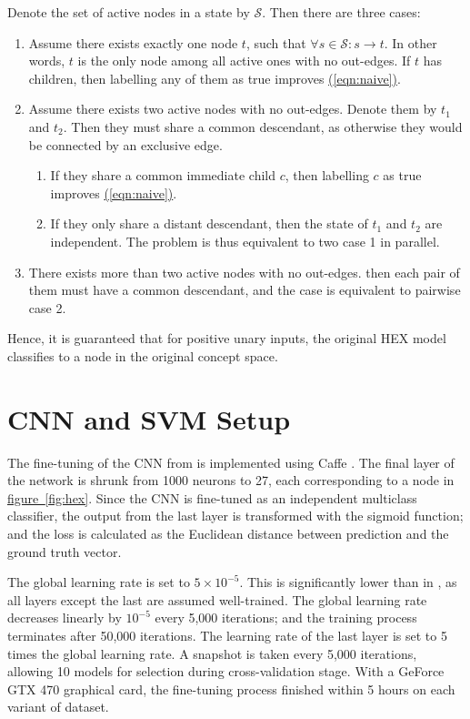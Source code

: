 \documentclass[11pt,a4paper]{book}
\begin{document}
Denote the set of active nodes in a state by $\mathcal{S}$. Then there are three cases:
\begin{enumerate}
\item Assume there exists exactly one node $t$, such that $\forall s\in\mathcal{S}:s\rightarrow t$. In other words, $t$ is the only node among all active ones with no out-edges. If $t$ has children, then labelling any of them as true improves \hyperref[eqn:naive]{(\ref{eqn:naive})}.
\item Assume there exists two active nodes with no out-edges. Denote them by $t_1$ and $t_2$. Then they must share a common descendant, as otherwise they would be connected by an exclusive edge.
\begin{enumerate}
\item If they share a common immediate child $c$, then labelling $c$ as true improves \hyperref[eqn:naive]{(\ref{eqn:naive})}.
\item If they only share a distant descendant, then the state of $t_1$ and $t_2$ are independent. The problem is thus equivalent to two case 1 in parallel.
\end{enumerate}
\item There exists more than two active nodes with no out-edges. then each pair of them must have a common descendant, and the case is equivalent to pairwise case 2.
\end{enumerate}
Hence, it is guaranteed that for positive unary inputs, the original HEX model classifies to a node in the original concept space.

\section{CNN and SVM Setup}
\label{sec:setup}

The fine-tuning of the CNN from \cite{krizhevsky2012imagenet} is implemented using Caffe \cite{jia2014caffe}. The final layer of the network is shrunk from 1000 neurons to 27, each corresponding to a node in \hyperref[fig:hex]{figure~\ref{fig:hex}}. Since the CNN is fine-tuned as an independent multiclass classifier, the output from the last layer is transformed with the sigmoid function; and the loss is calculated as the Euclidean distance between prediction and the ground truth vector.

The global learning rate is set to $5\times10^{-5}$. This is significantly lower than in \cite{krizhevsky2012imagenet}, as all layers except the last are assumed well-trained. The global learning rate decreases linearly by $10^{-5}$ every 5,000 iterations; and the training process terminates after 50,000 iterations. The learning rate of the last layer is set to 5 times the global learning rate. A snapshot is taken every 5,000 iterations, allowing 10 models for selection during cross-validation stage. With a GeForce GTX 470 graphical card, the fine-tuning process finished within 5 hours on each variant of dataset.
\end{document}

